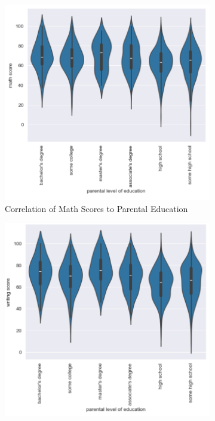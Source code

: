 \documentclass[fleqn,10pt]{olplainarticle}
\begin{document}
\begin{figure}[h!]
    \centering
    \begin{subfigure}{0.3\textwidth}
    \includegraphics[width=\linewidth]{MathVsParent.png}
    \caption{Correlation of Math Scores to Parental Education}
    \label{fig:1.a}
    \end{subfigure}
    \begin{subfigure}{0.3\textwidth}
    \includegraphics[width=\linewidth]{WritingVsParent.png}

\end{subfigure}
\end{figure}
\end{document}
